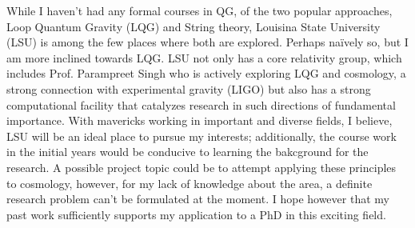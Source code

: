 While I haven't had any formal courses in QG, of the two popular approaches, Loop Quantum Gravity (LQG) and String theory, Louisina State University (LSU) is among the few places where both are explored. Perhaps na\"ively so, but I am more inclined towards LQG. LSU not only has a core relativity group, which includes Prof. Parampreet Singh who is actively exploring LQG and cosmology, a strong connection with experimental gravity (LIGO) but also has a strong computational facility that catalyzes research in such directions of fundamental importance. With mavericks working in important and diverse fields, I believe, LSU will be an ideal place to pursue my interests; additionally, the course work in the initial years would be conducive to learning the bakcground for the research. A possible project topic could be to attempt applying these principles to cosmology, however, for my lack of knowledge about the area, a definite research problem can't be formulated at the moment. I hope however that my past work sufficiently supports my application to a PhD in this exciting field.





